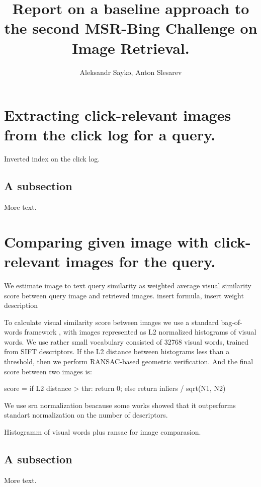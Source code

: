 \documentclass[11pt]{article} %
\title{Report on a baseline approach to the second MSR-Bing Challenge on Image Retrieval.}
\author{Aleksandr Sayko, Anton Slesarev}
\begin{document}
\maketitle


\section{Extracting click-relevant images from the  click log for a query.}

Inverted index on the click log.

\subsection{A subsection}

More text.

\section{Comparing given image with click-relevant images for the query.}

We estimate image to text query similarity as weighted average visual
similarity score between query image and retrieved images. {insert formula, insert weight description}

To calculate visual similarity score between images we use a standard bag-of-words
framework \cite{Sivic03}, with images represented as L2 normalized histograms of
visual words. We use rather small vocabulary consisted of 32768 visual
words, trained from SIFT descriptors. If the L2 distance between
histograms less than a threshold, then we perform RANSAC-based
geometric verification. And the final score between two images is:

score = 
if L2 distance > thr:
   return 0;
else 
 return inliers / sqrt(N1, N2)

We use srn normalization beacause some works\cite{jegou:inria-00602325} showed that it
outperforms standart normalization on the number of descriptors.


Histogramm of visual words plus ransac for image comparasion.

\subsection{A subsection}

More text.




\end{document}
